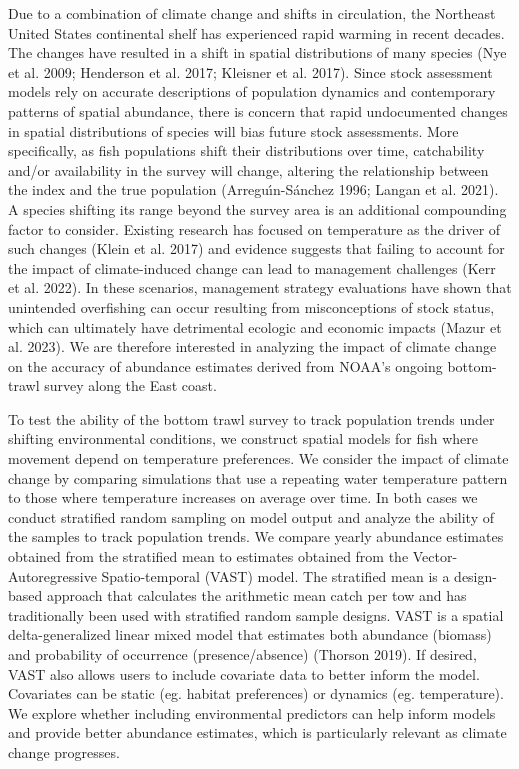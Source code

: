 \documentclass[
  12pt,
]{article}
\begin{document}
Due to a combination of climate change and shifts in circulation, the Northeast United States continental shelf has experienced rapid warming in recent decades. The changes have resulted in a shift in spatial distributions of many species (Nye et al. 2009; Henderson et al. 2017; Kleisner et al. 2017). Since stock assessment models rely on accurate descriptions of population dynamics and contemporary patterns of spatial abundance, there is concern that rapid undocumented changes in spatial distributions of species will bias future stock assessments. More specifically, as fish populations shift their distributions over time, catchability and/or availability in the survey will change, altering the relationship between the index and the true population (Arreguı́n-Sánchez 1996; Langan et al. 2021). A species shifting its range beyond the survey area is an additional compounding factor to consider. Existing research has focused on temperature as the driver of such changes (Klein et al. 2017) and evidence suggests that failing to account for the impact of climate-induced change can lead to management challenges (Kerr et al. 2022). In these scenarios, management strategy evaluations have shown that unintended overfishing can occur resulting from misconceptions of stock status, which can ultimately have detrimental ecologic and economic impacts (Mazur et al. 2023). We are therefore interested in analyzing the impact of climate change on the accuracy of abundance estimates derived from NOAA's ongoing bottom-trawl survey along the East coast.

To test the ability of the bottom trawl survey to track population trends under shifting environmental conditions, we construct spatial models for fish where movement depend on temperature preferences. We consider the impact of climate change by comparing simulations that use a repeating water temperature pattern to those where temperature increases on average over time. In both cases we conduct stratified random sampling on model output and analyze the ability of the samples to track population trends. We compare yearly abundance estimates obtained from the stratified mean to estimates obtained from the Vector-Autoregressive Spatio-temporal (VAST) model. The stratified mean is a design-based approach that calculates the arithmetic mean catch per tow and has traditionally been used with stratified random sample designs. VAST is a spatial delta-generalized linear mixed model that estimates both abundance (biomass) and probability of occurrence (presence/absence) (Thorson 2019). If desired, VAST also allows users to include covariate data to better inform the model. Covariates can be static (eg. habitat preferences) or dynamics (eg. temperature). We explore whether including environmental predictors can help inform models and provide better abundance estimates, which is particularly relevant as climate change progresses.
\end{document}

